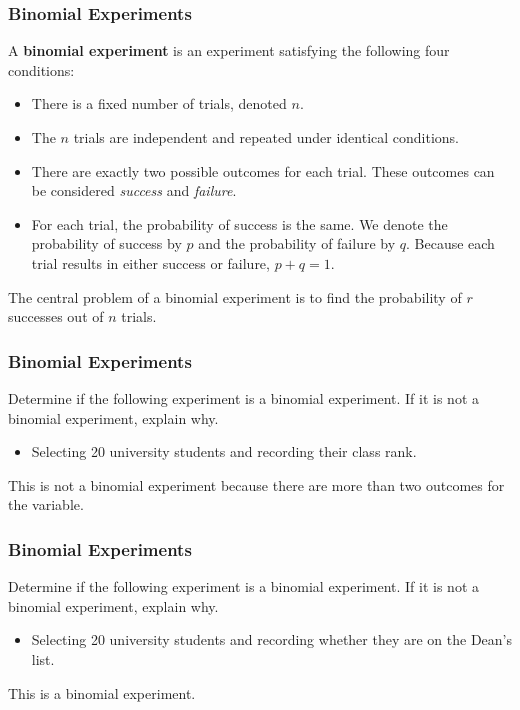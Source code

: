 \documentclass[Lecture.tex]{subfiles}
\begin{document}
\begin{frame}
\frametitle{Binomial Experiments}\pause
\begin{definition}
A \textbf{binomial experiment} is an experiment satisfying the following four conditions:
\begin{itemize}
\item There is a fixed number of trials, denoted $n$.\pause
\item The $n$ trials are independent and repeated under identical conditions.\pause
\item There are exactly two possible outcomes for each trial.  These outcomes can be considered \emph{success} and \emph{failure}.\pause
\item For each trial, the probability of success is the same.  We denote the probability of success by $p$ and the probability of failure by $q$.  Because each trial results in either success or failure, $p+q=1$. 
\end{itemize}\pause
The central problem of a binomial experiment is to find the probability of $r$ successes out of $n$ trials.
\end{definition}
\end{frame}

\begin{frame}
\frametitle{Binomial Experiments}\pause
\begin{example}
Determine if the following experiment  is a binomial experiment.  If it is not a binomial experiment, explain why.
\begin{itemize}
\item Selecting 20 university students and recording their class rank.
\end{itemize}
\end{example}\pause
This is not a binomial experiment because there are more than two outcomes for the variable.
\vspace*{3in}
\end{frame}

\begin{frame}
\frametitle{Binomial Experiments}
\begin{example}
Determine if the following experiment  is a binomial experiment.  If it is not a binomial experiment, explain why.
\begin{itemize}
\item Selecting 20 university students and recording whether they are on the Dean's list.
\end{itemize}
\end{example}\pause
This is a binomial experiment.
\vspace*{3in}
\end{frame}
\end{document}

